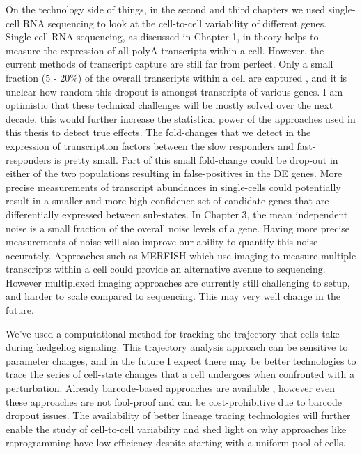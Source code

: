 On the technology side of things, in the second and third chapters we  used single-cell RNA sequencing to look at the cell-to-cell variability of different genes. Single-cell RNA sequencing, as discussed in Chapter 1, in-theory helps to measure the expression of all polyA transcripts within a cell. However, the current methods of transcript capture are still far from perfect. Only a small fraction (5 - 20\%) of the overall transcripts within a cell are captured \cite{battich_control_2015}, and it is unclear how random this dropout is amongst transcripts of various genes. I am optimistic that these technical challenges will be mostly solved over the next decade, this would further increase the statistical power of the approaches used in this thesis to detect true effects. The fold-changes that we detect in the expression of transcription factors between the slow responders and fast-responders is pretty small. Part of this small fold-change could be drop-out in either of the two populations resulting in false-positives in the DE genes. More precise measurements of transcript abundances in single-cells could potentially result in a smaller and more high-confidence set of candidate genes that are differentially expressed between sub-states. In Chapter 3, the mean independent noise is a small fraction of the overall noise levels of a gene. Having more precise measurements of noise will also improve our ability to quantify this noise accurately. Approaches such as MERFISH \cite{xia2019pnasu} which use imaging to measure multiple transcripts within a cell could provide an alternative avenue to sequencing. However multiplexed imaging approaches are currently still challenging to setup, and harder to scale compared to sequencing. This may very well change in the future.

We've used a computational method for tracking the trajectory that cells take during hedgehog signaling. This trajectory analysis approach can be sensitive to parameter changes, and in the future I expect there may be better technologies to trace the series of cell-state changes that a cell undergoes when confronted with a perturbation. Already barcode-based approaches are available \cite{Biddy2018-ct} \cite{moudgil2020c}, however even these approaches are not fool-proof and can be cost-prohibitive due to barcode dropout issues. The availability of better lineage tracing technologies will further enable the study of cell-to-cell variability and shed light on why approaches like reprogramming have low efficiency despite starting with a uniform pool of cells.

